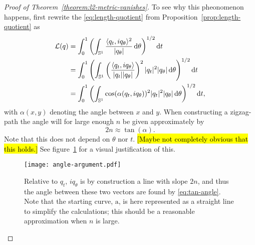 \begin{proof}[Proof of Theorem~\ref{theorem:l2-metric-vanishes}]
  To see why this  pheonomenon happens, first rewrite the \eqref{eq:length-quotient} from Proposition~\ref{prop:length-quotient} as
  \begin{align*}
    \mathcal{L}(q) &
                     = \int_{0}^{1}
                     \left(
                     \int_{\mathbb{S}^{1}} \frac{\langle q_{t},i q_{\theta}\rangle^2}
                     {|q_{\theta}|}  \mathop{}\!\mathrm{d} \theta
                     \right)^{1/2} \mathop{}\!\mathrm{d} t \\
                   & =  \int_{0}^{1}
                     \left(
                     \int_{\mathbb{S}^{1}}
                     \left(
                     \frac{\langle q_{t},i
                     q_{\theta}\rangle}{| q_{t}|| q_{\theta}|}
                     \right)^2
                     | q_t|^2   | q_{\theta}|
                     \mathop{}\!\mathrm{d} \theta
                     \right)^{1/2} \mathop{}\!\mathrm{d} t \\
                   &  =
                     \int_{0}^{1}
                     \left(
                     \int_{\mathbb{S}^{1}}
                     \cos(\alpha( q_t, i q_{\theta}))^2
                     | q_t|^2   | q_{\theta}|
                     \mathop{}\!\mathrm{d} \theta
                     \right)^{1/2}\mathop{}\!\mathrm{d} t,
  \end{align*}
  with $\alpha(x,y)$ denoting the angle between $x$ and $y$.
  When constructing a zigzag-path the angle will for large enough $n$ be given approximately by
  \begin{equation}
    \label{eq:tan-angle}
    2n \approx \tan(\alpha).
  \end{equation}
  Note that this does not depend on $\theta$ nor $t$.
  \hl{[Maybe not completely obvious that this holds.]}
  See figure~\ref{fig:angle-arg} for a visual justification of this.
  \begin{figure}[h]
    \centering
    \texttt{[image: angle-argument.pdf]}
    \caption{Relative to $q_t$, $iq_{\theta}$ is by construction a line with slope $2n$, and thus the angle between these two vectors are found by \eqref{eq:tan-angle}. Note that the starting curve, $\mathrm{a}$, is here represented as a straight line to simplify the calculations; this should be a reasonable approximation when $n$ is large.}
    \label{fig:angle-arg}
  \end{figure}


\end{proof}
